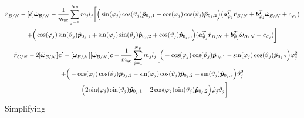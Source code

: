 \begin{multline}
	\ddot{\bm r}_{B/N}-[\tilde{\bm{c}}] \dot{\bm\omega}_{\cal B/N}-\frac{1}{m_{\text{sc}}}\sum_{j=1}^{N_{P}}m_j l_j \bigg[
	\Big(\sin(\varphi_j)\cos(\vartheta_j)\bm{\hat{p}}_{0_j,1}-\cos(\varphi_j)\cos(\vartheta_j)\bm{\hat{p}}_{0_j,2}\Big)(\bm a_{\varphi_j}^T \ddot{\bm{r}}_{B/N} + \bm b_{\varphi_j}^T \dot{\bm\omega}_{\cal B/N} +c_{\varphi_j}) \\ +\Big(\cos(\varphi_j)\sin(\vartheta_j)\bm{\hat{p}}_{0_j,1}+\sin(\varphi_j)\sin(\vartheta_j)\bm{\hat{p}}_{0_j,2}+\cos(\vartheta_j)\bm{\hat{p}}_{0_j,3}\Big)(\bm a_{\vartheta_j}^T \ddot{\bm r}_{B/N} + \bm b_{\vartheta_j}^T \dot{\bm\omega}_{\cal B/N} + c_{\vartheta_j})
	\bigg]
	\\= \ddot{\bm r}_{C/N} 	- 2[\tilde{\bm\omega}_{\cal B/N}] \bm c'
	-[\tilde{\bm\omega}_{\cal B/N}][\tilde{\bm\omega}_{\cal B/N}]\bm{c}
	-\frac{1}{m_{\text{sc}}}\sum_{j=1}^{N_{P}}m_j l_j \bigg[
	\Big(-\cos(\varphi_j)\cos(\vartheta_j)\bm{\hat{p}}_{0_j,1}-\sin(\varphi_j)\cos(\vartheta_j)\bm{\hat{p}}_{0_j,2}\Big)\dot{\varphi}_j^2\\
	+\Big(-\cos(\varphi_j)\cos(\vartheta_j)\bm{\hat{p}}_{0_j,1}-\sin(\varphi_j)\cos(\vartheta_j)\bm{\hat{p}}_{0_j,2}+\sin(\vartheta_j)\bm{\hat{p}}_{0_j,3} \Big)\dot{\vartheta}_j^2\\ +
	\Big(2\sin(\varphi_j)\sin(\vartheta_j)\bm{\hat{p}}_{0_j,1} -2\cos(\varphi_j)\sin(\vartheta_j)\bm{\hat{p}}_{0_j,2}\Big)\dot{\varphi}_j\dot{\vartheta}_j
	\bigg]
	\label{eq:Rbddot5}
\end{multline}
Simplifying

